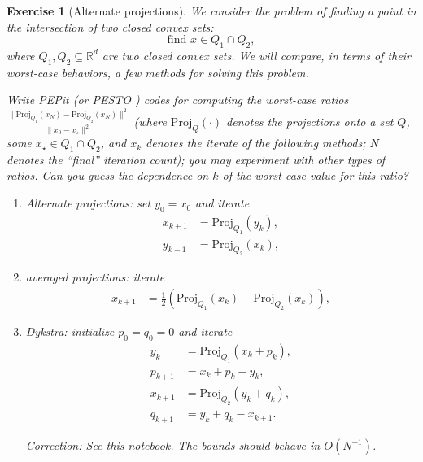 \documentclass[11pt,a4paper]{article}
\newcommand{\pesto}{{PESTO }}
\newcommand{\pepit}{{PEPit }}
\newcommand{\correction}[1]{{{\color{blue}\underline{Correction:} #1}}}
\newcommand{\correction}[1]{}
\newtheorem{exercise}{Exercise}
\begin{document}
\begin{exercise}[Alternate projections]\label{ex:alt} We consider the problem of finding a point in the intersection of two closed convex sets:
	\[ \text{find } x \in Q_1\cap Q_2,\]
where $Q_1,Q_2\subseteq \mathbb{R}^d$ are two closed convex sets. We will compare, in terms of their worst-case behaviors, a few methods for solving this problem. 

Write \pepit (or \pesto\!\!) codes for computing the worst-case ratios $\frac{\|\mathrm{Proj}_{Q_1}(x_N)-\mathrm{Proj}_{Q_2}(x_N)\|^2}{\|x_0-x_\star\|^2}$ (where $\mathrm{Proj}_Q(\cdot)$ denotes the projections onto a set $Q$, some $x_\star\in Q_1\cap Q_2$, and $x_k$ denotes the iterate of the following methods; $N$ denotes the ``final'' iteration count); you may experiment with other types of ratios. Can you guess the dependence on $k$ of the worst-case value for this ratio?
	\begin{enumerate}
	\item Alternate projections: set $y_0=x_0$ and iterate
	\begin{equation*}
	\begin{aligned}
	x_{k+1}&=\mathrm{Proj}_{Q_1}(y_k),\\
	y_{k+1}&=\mathrm{Proj}_{Q_2}(x_k),
	\end{aligned}
	\end{equation*}
	\item averaged projections: iterate
	\begin{equation*}
	\begin{aligned}
	x_{k+1}&= \frac12 \left(\mathrm{Proj}_{Q_1}(x_k)+\mathrm{Proj}_{Q_2}(x_k)\right),
	\end{aligned}
	\end{equation*}
	\item Dykstra: initialize $p_0=q_0=0$ and iterate
	\begin{equation*}
	\begin{aligned}
	y_{k}&=\mathrm{Proj}_{Q_1}(x_k+p_k),\\
	p_{k+1}&=x_k+p_k-y_k,\\
	x_{k+1}&=\mathrm{Proj}_{Q_2}(y_k+q_k),\\
	q_{k+1}&=y_k+q_k-x_{k+1}.
	\end{aligned}
	\end{equation*}
	
	\correction{See \href{https://github.com/PerformanceEstimation/Learning-Performance-Estimation/tree/main/Codes/Jupyter/Exercise11.ipynb}{this notebook}. The bounds should behave in $O(N^{-1})$.}
	\end{enumerate}
	\end{exercise}
\end{document}
